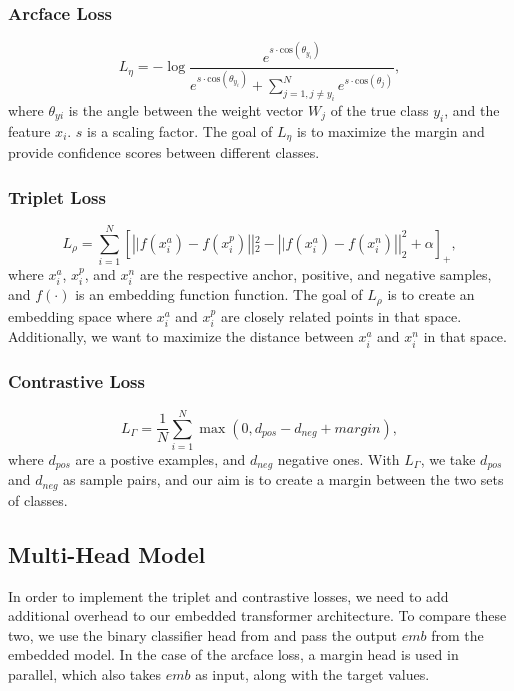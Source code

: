 \documentclass[10pt,twocolumn,letterpaper]{article}
\begin{document}
\subsubsection{Arcface Loss}
\begin{equation}
L_\eta = -\log \frac{e^{s\cdot \text{cos}(\theta_{y_i})}}{e^{s\cdot \text{cos}(\theta_{y_i})} + \sum_{j=1, j\neq y_i}^N e^{s\cdot \text{cos}(\theta_j)}},
\end{equation}
where $\theta_{yi}$ is the angle between the weight vector $W_j$ of the true class $y_i$, and the feature $x_i$. $s$ is a scaling factor. The goal of $L_\eta$ is to maximize 
the margin and provide confidence scores between different classes.
\subsubsection{Triplet Loss}
\begin{equation}
    L_\rho = \sum_{i=1}^{N}\left[\left||f\left(x_{i}^{a}\right)-f\left(x_{i}^{p}\right)\right||_{2}^{2}-\left||f\left(x_{i}^{a}\right)-f\left(x_{i}^{n}\right)\right||_{2}^{2}+\alpha\right]_{+},
\end{equation}
where $x_i^a$, $x_i^p$, and $x_i^n$ are the respective anchor, positive, and negative samples, and $f(\cdot)$ is an embedding function function. The goal of $L_\rho$ is to create an embedding space where $x_i^a$ and $x_i^p$ are closely related points in that space. Additionally, 
we want to maximize the distance between $x_i^a$ and $x_i^n$ in that space.
\subsubsection{Contrastive Loss}
\begin{equation}
L_\Gamma = \frac{1}{N} \sum_{i=1}^N \max(0, d_{pos} - d_{neg} + margin),
\end{equation}
where $d_{pos}$ are a postive examples, and $d_{neg}$ negative ones. With $L_\Gamma$, we take $d_{pos}$ and $d_{neg}$ as sample pairs, and our aim is to create a margin between the two sets of classes.

\subsection{Multi-Head Model}
In order to implement the triplet and contrastive losses, we need to add additional overhead to our embedded transformer architecture. 
To compare these two, we use the binary classifier head from \cite{repo} and pass the output $emb$ from the embedded model.  In the case of the arcface loss, a margin head is used in parallel, which also takes $emb$ as input, along with the target values.
\end{document}
